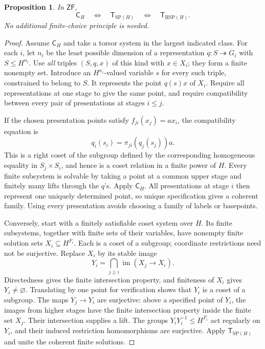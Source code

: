 \documentclass[11pt,a4paper]{article}
\newtheorem{proposition}[theorem]{Proposition}
\theoremstyle{definition}\newtheorem{definition}[theorem]{Definition}
\theoremstyle{remark}\newtheorem{remark}[theorem]{Remark}
\newcommand{\ZF}{\mathsf{ZF}}\newcommand{\ZFA}{\mathsf{ZFA}}
\begin{document}
\begin{proposition}\label{prop:fixedgroupcompactness}
In $\ZF$,
\[
\mathsf C_H\quad\Longleftrightarrow\quad
\mathsf T_{\mathrm{SP}(H)}\quad\Longleftrightarrow\quad
\mathsf T_{\mathrm{HSP}(H)}.
\]
No additional finite-choice principle is needed.
\end{proposition}
\begin{proof}
Assume $\mathsf C_H$ and take a torsor system in the largest indicated class. For each $i$, let $n_i$ be the least possible dimension of a representation $q:S\twoheadrightarrow G_i$ with $S\leq H^{n_i}$. Use \emph{all} triples $(S,q,x)$ of this kind with $x\in X_i$; they form a finite nonempty set. Introduce an $H^{n_i}$-valued variable $s$ for every such triple, constrained to belong to $S$. It represents the point $q(s)x$ of $X_i$. Require all representations at one stage to give the same point, and require compatibility between every pair of presentations at stages $i\leq j$.

If the chosen presentation points satisfy $f_{ji}(x_j)=a x_i$, the compatibility equation is
\[
q_i(s_i)=\pi_{ji}(q_j(s_j))a.
\]
This is a right coset of the subgroup defined by the corresponding homogeneous equality in $S_j\times S_i$, and hence is a coset relation in a finite power of $H$. Every finite subsystem is solvable by taking a point at a common upper stage and finitely many lifts through the $q$'s. Apply $\mathsf C_H$. All presentations at stage $i$ then represent one uniquely determined point, so unique specification gives a coherent family. Using every presentation avoids choosing a family of labels or basepoints.

Conversely, start with a finitely satisfiable coset system over $H$. Its finite subsystems, together with finite sets of their variables, have nonempty finite solution sets $X_i\subseteq H^{F_i}$. Each is a coset of a subgroup; coordinate restrictions need not be surjective. Replace $X_i$ by its stable image
\[
Y_i=\bigcap_{j\geq i}\operatorname{im}(X_j\longrightarrow X_i).
\]
Directedness gives the finite intersection property, and finiteness of $X_i$ gives $Y_i\ne\varnothing$. Translating by one point for verification shows that $Y_i$ is a coset of a subgroup. The maps $Y_j\to Y_i$ are surjective: above a specified point of $Y_i$, the images from higher stages have the finite intersection property inside the finite set $X_j$. Their intersection supplies a lift. The groups $Y_iY_i^{-1}\leq H^{F_i}$ act regularly on $Y_i$, and their induced restriction homomorphisms are surjective. Apply $\mathsf T_{\mathrm{SP}(H)}$ and unite the coherent finite solutions.
\end{proof}
\end{document}
